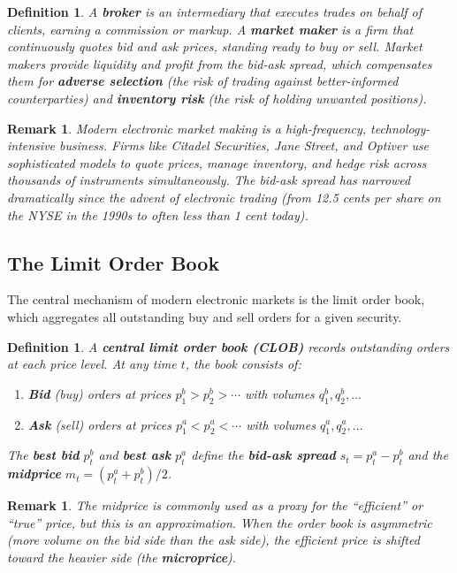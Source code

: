 \documentclass{report}
\theoremstyle{spacedplain}
\theoremstyle{spaceddefinition}
\newtheorem{definition}[theorem]{Definition}
\theoremstyle{spacedremark}
\newtheorem{remark}[theorem]{Remark}
\begin{document}
\begin{definition}
A \textbf{broker} is an intermediary that executes trades on behalf of clients, earning a commission or markup. A \textbf{market maker} is a firm that continuously quotes bid and ask prices, standing ready to buy or sell. Market makers provide liquidity and profit from the bid-ask spread, which compensates them for \textbf{adverse selection} (the risk of trading against better-informed counterparties) and \textbf{inventory risk} (the risk of holding unwanted positions).
\end{definition}

\begin{remark}
Modern electronic market making is a high-frequency, technology-intensive business. Firms like Citadel Securities, Jane Street, and Optiver use sophisticated models to quote prices, manage inventory, and hedge risk across thousands of instruments simultaneously. The bid-ask spread has narrowed dramatically since the advent of electronic trading (from 12.5 cents per share on the NYSE in the 1990s to often less than 1 cent today).
\end{remark}


\subsection{The Limit Order Book}

The central mechanism of modern electronic markets is the limit order book, which aggregates all outstanding buy and sell orders for a given security.

\begin{definition}
A \textbf{central limit order book (CLOB)} records outstanding orders at each price level. At any time $t$, the book consists of:
\begin{enumerate}
    \item \textbf{Bid} (buy) orders at prices $p_1^b > p_2^b > \cdots$ with volumes $q_1^b, q_2^b, \ldots$
    \item \textbf{Ask} (sell) orders at prices $p_1^a < p_2^a < \cdots$ with volumes $q_1^a, q_2^a, \ldots$
\end{enumerate}
The \textbf{best bid} $p_t^b$ and \textbf{best ask} $p_t^a$ define the \textbf{bid-ask spread} $s_t = p_t^a - p_t^b$ and the \textbf{midprice} $m_t = (p_t^a + p_t^b)/2$.
\end{definition}

\begin{remark}
The midprice is commonly used as a proxy for the ``efficient'' or ``true'' price, but this is an approximation. When the order book is asymmetric (more volume on the bid side than the ask side), the efficient price is shifted toward the heavier side (the \textbf{microprice}).
\end{remark}
\end{document}
